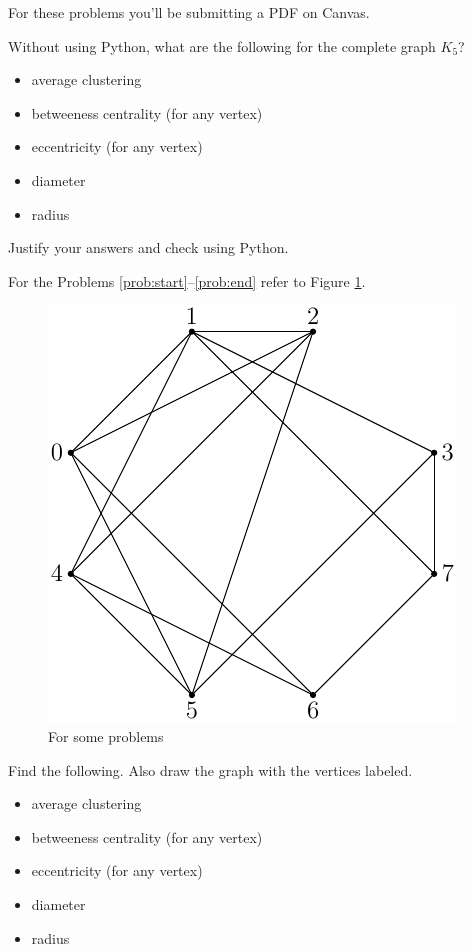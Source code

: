 \documentclass[11pt,letterpaper]{article}
\begin{document}
For these problems you'll be submitting a PDF on Canvas. 

\begin{problem}
 Without using Python, what are the following for the complete graph $K_5$?
 \begin{itemize}
  \item average clustering
  \item betweeness centrality (for any vertex)
  \item eccentricity (for any vertex)
  \item diameter
  \item radius
 \end{itemize}
 Justify your answers and check using Python. 
\end{problem}


For the Problems \ref{prob:start}--\ref{prob:end} refer to Figure \ref{fig:prob}.
\begin{figure}[!ht]
 \centering
 \includegraphics{images/problem_02.pdf}
 \caption{For some problems}
 \label{fig:prob}  
\end{figure}


\begin{problem}
 \label{prob:start}
 Find the following. Also draw the graph with the vertices labeled. 
  \begin{itemize}
   \item average clustering
   \item betweeness centrality (for any vertex)
   \item eccentricity (for any vertex)
 \item diameter
 \item radius
  \end{itemize}
\end{problem} 
\end{document}
